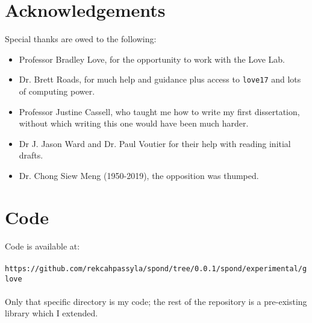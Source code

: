 
\newpage
\section*{Acknowledgements}

Special thanks are owed to the following:

\begin{itemize}
    \item Professor Bradley Love, for the opportunity to work with the Love Lab.
    \item Dr. Brett Roads, for much help and guidance plus access to \texttt{love17} and lots of computing power. 
    \item Professor Justine Cassell, who taught me how to write my first dissertation, without which writing this one would have been much harder. 
    \item Dr J. Jason Ward and Dr. Paul Voutier for their help with reading initial drafts.
    \item Dr. Chong Siew Meng (1950-2019), the opposition was thumped.
\end{itemize}

\section*{Code}
Code is available at: \\
\\
\texttt{https://github.com/rekcahpassyla/spond/tree/0.0.1/spond/experimental/glove} \\
\\
Only that specific directory is my code; the rest of the repository is a pre-existing library which I extended. 